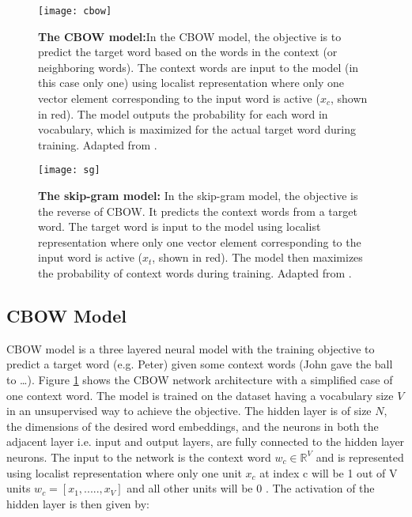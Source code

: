 \begin{figure}[hbtp]
\centering
\texttt{[image: cbow]}
\caption[The CBOW model]{\textbf{The CBOW model:}{\small In the CBOW model, the objective is to predict the target word based on the words in the context (or neighboring words). The context words are input to the model (in this case only one) using localist representation where only one vector element corresponding to the input word is active ($x_{c}$, shown in red). The model outputs the probability for each word in vocabulary, which is maximized for the actual target word during training. Adapted from \cite{w2v:parameter_learning}.}}
\label{fig:cbow}
\end{figure}

\begin{figure}[hbtp]
\centering
\texttt{[image: sg]}
\caption[The Skip-gram model]{\textbf{The skip-gram model: }{\small In the skip-gram model, the objective is the reverse of CBOW. It predicts the context words from a target word. The target word is input to the model using localist representation where only one vector element corresponding to the input word is active ($x_{t}$, shown in red). The model then maximizes the probability of context words during training. Adapted from \cite{w2v:parameter_learning}.}}
\label{fig:sg}
\end{figure}

\subsection{CBOW Model}

CBOW  model is a three layered neural model with the training objective to predict a target word (e.g. Peter) given some context words (John gave the ball to …). Figure \ref{fig:cbow} shows the CBOW network architecture with a simplified case of one context word. The model is trained on the dataset having a vocabulary size $V$ in an unsupervised way to achieve the objective. The hidden layer is of size $N$, the dimensions of the desired word embeddings, and the neurons in both the adjacent layer i.e. input and output layers,  are fully connected to the hidden layer neurons. The input to the network is the context word $w_c {\in} \mathbb{R}^{V}$ and is represented using localist representation where only one unit $x_c$ at index c will be 1 out of V units $w_c=[{x_1,.....,x_V}]$ and all other units will be 0 \cite{w2v:parameter_learning}. The activation of the hidden layer is then given by:


